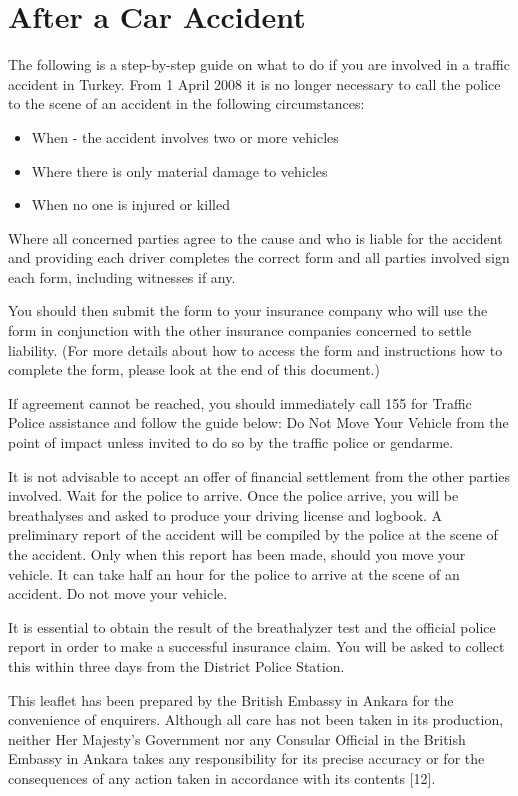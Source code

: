 \section{After a Car Accident}
The following is a step-by-step guide on what to do if you are involved in a traffic accident in Turkey.
From 1 April 2008 it is no longer necessary to call the police to the scene of an accident in the following circumstances:\cite{guo2004learning}

\begin{itemize}
\item When - the accident involves two or more vehicles
\item Where there is only material damage to vehicles
\item When no one is injured or killed
\end{itemize}

Where all concerned parties agree to the cause and who is liable for the accident and providing each driver completes the correct form and all parties involved sign each form, including witnesses if any. 

You should then submit the form to your insurance company who will use the form in conjunction with the other insurance companies concerned to settle liability. (For more details about how to access the form and instructions how to complete the form, please look at the end of this document.) \cite{van2007experimental}

If agreement cannot be reached, you should immediately call 155 for Traffic Police assistance and follow the guide below:
Do Not Move Your Vehicle from the point of impact unless invited to do so by the traffic police or gendarme.

It is not advisable to accept an offer of financial settlement from the other parties involved. Wait for the police to arrive.
Once the police arrive, you will be breathalyses and asked to produce your driving license and logbook. A preliminary report of the accident will be compiled by the police at the scene of the accident. Only when this report has been made, should you move your vehicle.  It can take half an hour for the police to arrive at the scene of an accident. Do not move your vehicle.

It is essential to obtain the result of the breathalyzer test and the official police report in order to make a successful insurance claim. You will be asked to collect this within three days from the District Police Station.

This leaflet has been prepared by the British Embassy in Ankara for the convenience of enquirers.  Although all care has not been taken in its production, neither Her Majesty's Government nor any Consular Official in the British Embassy in Ankara takes any responsibility for its precise accuracy or for the consequences of any action taken in accordance with its contents [12].
